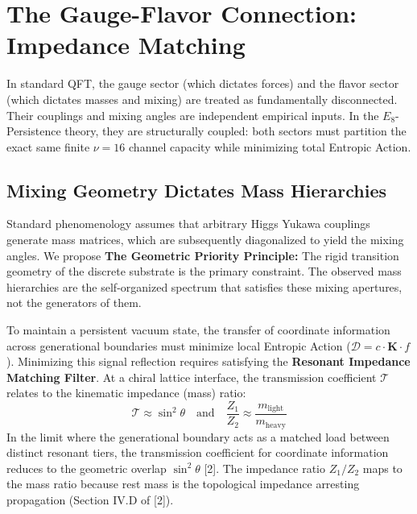 
\section{The Gauge-Flavor Connection: Impedance Matching}

In standard QFT, the gauge sector (which dictates forces) and the flavor sector (which dictates masses and mixing) are treated as fundamentally disconnected. Their couplings and mixing angles are independent empirical inputs. In the $E_8$-Persistence theory, they are structurally coupled: both sectors must partition the exact same finite $\nu=16$ channel capacity while minimizing total Entropic Action.


\subsection{Mixing Geometry Dictates Mass Hierarchies}

Standard phenomenology assumes that arbitrary Higgs Yukawa couplings generate mass matrices, which are subsequently diagonalized to yield the mixing angles. We propose \textbf{The Geometric Priority Principle:} The rigid transition geometry of the discrete substrate is the primary constraint. The observed mass hierarchies are the self-organized spectrum that satisfies these mixing apertures, not the generators of them.

To maintain a persistent vacuum state, the transfer of coordinate information across generational boundaries must minimize local Entropic Action ($\mathcal{D} = c \cdot \mathbf{K} \cdot f$). Minimizing this signal reflection requires satisfying the \textbf{Resonant Impedance Matching Filter}. At a chiral lattice interface, the transmission coefficient $\mathcal{T}$ relates to the kinematic impedance (mass) ratio:
\begin{equation}
    \mathcal{T} \approx \sin^2 \theta \quad \text{and} \quad \frac{Z_1}{Z_2} \approx \frac{m_{\text{light}}}{m_{\text{heavy}}}
\end{equation}
In the limit where the generational boundary acts as a matched load between distinct resonant tiers, the transmission coefficient for coordinate information reduces to the geometric overlap $\sin^2\theta$ [2]. The impedance ratio $Z_1/Z_2$ maps to the mass ratio because rest mass is the topological impedance arresting propagation (Section IV.D of [2]).

